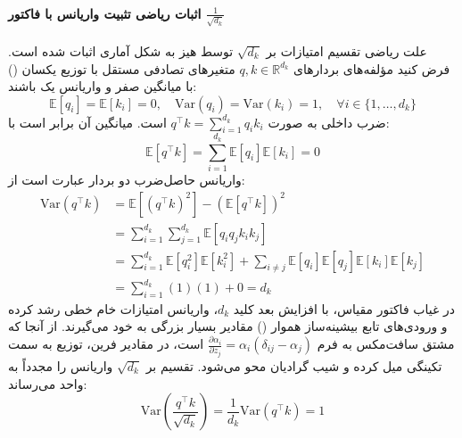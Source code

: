 \paragraph*{اثبات ریاضی تثبیت واریانس با فاکتور $\frac{1}{\sqrt{d_k}}$}
علت ریاضی تقسیم امتیازات بر $\sqrt{d_k}$ توسط هیز \cite{hays2026attention} به شکل آماری اثبات شده است.
فرض کنید مؤلفه‌های بردارهای $q, k \in \mathbb{R}^{d_k}$ متغیرهای تصادفی مستقل با توزیع یکسان () با میانگین صفر و واریانس یک باشند:
\begin{equation}
    \mathbb{E}[q_i] = \mathbb{E}[k_i] = 0, \quad \text{Var}(q_i) = \text{Var}(k_i) = 1, \quad \forall i \in \{1, \dots, d_k\}
\end{equation}
ضرب داخلی به صورت $q^\top k = \sum_{i=1}^{d_k} q_i k_i$ است. میانگین آن برابر است با:
\begin{equation}
    \mathbb{E}[q^\top k] = \sum_{i=1}^{d_k} \mathbb{E}[q_i] \mathbb{E}[k_i] = 0
\end{equation}
واریانس حاصل‌ضرب دو بردار عبارت است از:
\begin{equation}
    \begin{aligned}
        \text{Var}(q^\top k) &= \mathbb{E}[(q^\top k)^2] - (\mathbb{E}[q^\top k])^2 \\
        &= \sum_{i=1}^{d_k} \sum_{j=1}^{d_k} \mathbb{E}[q_i q_j k_i k_j] \\
        &= \sum_{i=1}^{d_k} \mathbb{E}[q_i^2] \mathbb{E}[k_i^2] + \sum_{i \neq j} \mathbb{E}[q_i] \mathbb{E}[q_j] \mathbb{E}[k_i] \mathbb{E}[k_j] \\
        &= \sum_{i=1}^{d_k} (1)(1) + 0 = d_k
    \end{aligned}
\end{equation}
در غیاب فاکتور مقیاس، با افزایش بعد کلید $d_k$، واریانس امتیازات خام خطی رشد کرده و ورودی‌های تابع بیشینه‌ساز هموار () مقادیر بسیار بزرگی به خود می‌گیرند. از آنجا که مشتق سافت‌مکس به فرم $\frac{\partial \alpha_i}{\partial z_j} = \alpha_i(\delta_{ij} - \alpha_j)$ است، در مقادیر فرین، توزیع به سمت تکینگی میل کرده و شیب گرادیان محو می‌شود. تقسیم بر $\sqrt{d_k}$ واریانس را مجدداً به واحد می‌رساند:
\begin{equation}
    \text{Var}\left(\frac{q^\top k}{\sqrt{d_k}}\right) = \frac{1}{d_k} \text{Var}(q^\top k) = 1
\end{equation}

